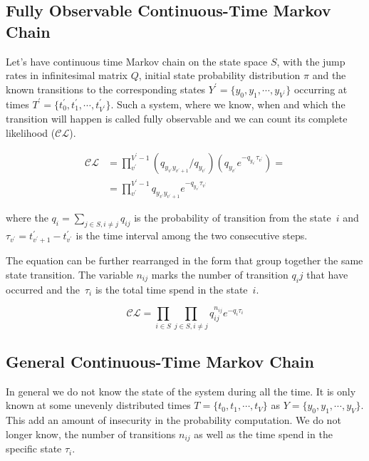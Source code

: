 \documentclass[thesis=M,english]{FITthesis}[2012/10/20]
\begin{document}

\subsection{ Fully Observable Continuous-Time Markov Chain }

Let's have continuous time Markov chain on the state space $S$, with the jump rates in infinitesimal matrix $Q$, initial state probability distribution $\pi$ and the known transitions to the corresponding states $Y^{'}= \{y_0, y_1, \cdots, y_{V^{'}} \} $ occurring at times $T^{'} = \{ t_0^{'}, t_1^{'}, \cdots, t_{V^{'}}^{'} \}$. Such a system, where we know, when and which the transition will happen is called fully observable and we can count its complete likelihood ($\mathcal{CL}$). 

\begin{equation}\label{eq:CL1}
\begin{aligned}  
 \mathcal{CL} &=  \prod_{v^{'}}^{V^{'}-1} ( q_{y_{v^{'}} y_{v^{'}+1}} / q_{y_{v^{'}}} )( q_{y_{v^{'}}} e^{ - q_{y_{v^{'}}} \tau_{v^{'}} }) = \\
    &= \prod_{v^{'}}^{V^{'}-1} q_{y_{v^{'}} y_{v^{'}+1}} e^{ - q_{y_{v^{'}}} \tau_{v^{'}} }
\end{aligned}
\end{equation}

where the $q_i = \sum_{j\in S, i\neq j} q_{ij}$ is the probability of transition from the state~$i$ and   
$\tau_{v^{'}} = t_{v^{'}+1}^{'} - t_{v^{'}}^{'}$ is the time interval among the two consecutive steps.

The equation can be further rearranged in the form that group together the same state transition. The variable $n_{ij}$ marks the number of transition $q_ij$ that have occurred and the~$\tau_i$ is the total time spend in the state~$i$.

\begin{equation}\label{eq:CL2}
 \mathcal{CL} = \prod_{i \in S} \prod_{j \in S, i \neq j} q_{ij}^{n_{ij} } e^{ - q_i \tau_i }
\end{equation}

\subsection{ General Continuous-Time Markov Chain }

In general we do not know the state of the system during all the time. It is only known at some unevenly distributed times $T = \{ t_0, t_1, \cdots, t_{V} \}$ as $Y= \{y_0, y_1, \cdots, y_{V} \}$. 
This add an amount of insecurity in the probability computation. We do not longer know, the number of transitions $n_{ij}$ as well as the time spend in the specific state $\tau_i$. 
\end{document}
